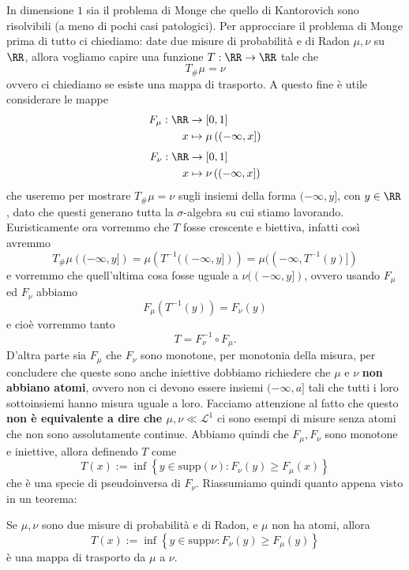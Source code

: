 \documentclass[11pt]{scrartcl}
\begin{document}
	In dimensione $1$ sia il problema di Monge che quello di Kantorovich sono risolvibili (a meno di pochi casi patologici). Per approcciare il problema di Monge prima di tutto ci chiediamo: date due misure di probabilità e di Radon $\mu,\nu$ su $\RR$, allora vogliamo capire una funzione $T:\RR\to\RR$ tale che 
	$$T_\#\mu=\nu$$
	ovvero ci chiediamo se esiste una mappa di trasporto. A questo fine è utile considerare le mappe
	\begin{align*}
		F_\mu:\RR & \to[0,1] \\
		x & \mapsto \mu\left((-\infty,x]\right)
	\end{align*}
	\begin{align*}
		F_\nu:\RR & \to[0,1] \\
		x & \mapsto \nu\left((-\infty,x]\right)
	\end{align*}
	che useremo per mostrare $T_\#\mu=\nu$ sugli insiemi della forma $(-\infty,y]$, con $y\in\RR$, dato che questi generano tutta la $\sigma$-algebra su cui stiamo lavorando. Euristicamente ora vorremmo che $T$ fosse crescente e biettiva, infatti così avremmo
	$$T_\#\mu\left((-\infty,y]\right)=\mu\left(T^{-1}((-\infty,y])\right)=\mu((-\infty,T^{-1}(y)])$$
	e vorremmo che quell'ultima cosa fosse uguale a $\nu((-\infty,y])$, ovvero usando $F_\mu$ ed $F_\nu$ abbiamo
	$$F_\mu(T^{-1}(y))=F_\nu(y)$$
	e cioè vorremmo tanto
	$$T=F_\nu^{-1}\circ F_\mu.$$
	D'altra parte sia $F_\mu$ che $F_\nu$ sono monotone, per monotonia della misura, per concludere che queste sono anche iniettive dobbiamo richiedere che $\mu$ e $\nu$ \textbf{non abbiano atomi}, ovvero non ci devono essere insiemi $(-\infty,a]$ tali che tutti i loro sottoinsiemi hanno misura uguale a loro. Facciamo attenzione al fatto che questo \textbf{non è equivalente a dire che $\mu,\nu\ll\mathscr{L}^1$} ci sono esempi di misure senza atomi che non sono assolutamente continue. Abbiamo quindi che $F_\mu,F_\nu$ sono monotone e iniettive, allora definendo $T$ come
	$$T(x):=\inf\left\{y\in\text{supp}(\nu):F_\nu(y)\ge F_\mu(x)\right\}$$
	che è una specie di pseudoinversa di $F_\nu$. Riassumiamo quindi quanto appena visto in un teorema:
	\begin{theorem}
		Se $\mu,\nu$ sono due misure di probabilità e di Radon, e $\mu$ non ha atomi, allora 
		$$T(x):=\inf\left\{y\in\text{supp}\nu:F_\nu(y)\ge F_\mu(y)\right\}$$
		è una mappa di trasporto da $\mu$ a $\nu$.
	\end{theorem}
\end{document}
